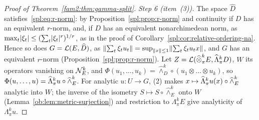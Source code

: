 \begin{proof}[Proof of Theorem~\ref{fam2:thm:gamma-split}]
\emph{Step 6 (item~(3)).} The space $\widehat D$ satisfies~\eqref{spl:eq:r-norm}: by Proposition~\ref{spl:prop:r-norm} and
continuity if $D$ has an equivalent $r$-norm, and, if $D$ has an equivalent nonarchimedean norm, as
$\max_t\lvert \xi_t\rvert\le(\sum_t\lvert \xi_t\rvert^r)^{1/r}$, as in the proof of Corollary~\ref{spl:cor:relative-ordering-na}. Hence
so does $G=\mathcal L(E,\widehat D)$, as $\lVert \sum_t\xi_tu_t\rVert=\sup_{\lVert x\rVert\le1}\lVert \sum_t\xi_tu_tx\rVert$, and $G$ has an equivalent
$r$-norm (Proposition~\ref{spl:prop:r-norm}). Let $Z=\mathcal L(\mathbin{\widehat\otimes}^k_\pi E,\widehat\Lambda^k_\pi D)$, $W$ its operators vanishing on
$\mathcal N^k_E$, and $\Phi(u_1,\dots,u_k)=\widehat\wedge^k_D\circ(u_1\otimes\dots\otimes u_k)$, so $\Phi(u,\dots,u)=
\widehat\Lambda^k_\pi u\circ\widehat\wedge^k_E$. For analytic $u\colon U\to G$, (2) makes $x\mapsto\widehat\Lambda^k_\pi u(x)\circ
\widehat\wedge^k_E$ analytic into $W$; the inverse of the isometry $S\mapsto S\circ\widehat\wedge^k_E$ onto $W$
(Lemma~\ref{ob:lem:metric-surjection}) and restriction to $\Lambda^k_\pi E$ give analyticity of $\Lambda^k_\pi u$.
\end{proof}

